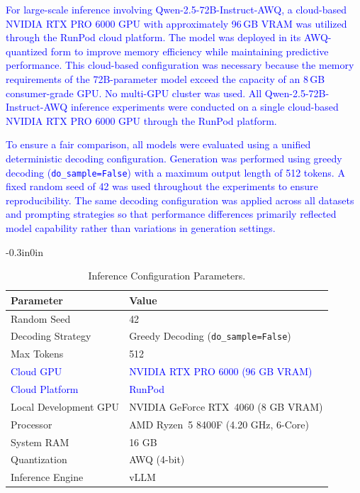 \documentclass[10pt,letterpaper]{article}
\newcommand{\rev}[1]{\textcolor{blue}{#1}}
\begin{document}
\rev{
For large-scale inference involving Qwen-2.5-72B-Instruct-AWQ, a cloud-based NVIDIA RTX PRO 6000 GPU with approximately 96\,GB VRAM was utilized through the RunPod cloud platform. The model was deployed in its AWQ-quantized form to improve memory efficiency while maintaining predictive performance. This cloud-based configuration was necessary because the memory requirements of the 72B-parameter model exceed the capacity of an 8\,GB consumer-grade GPU. No multi-GPU cluster was used. All Qwen-2.5-72B-Instruct-AWQ inference experiments were conducted on a single cloud-based NVIDIA RTX PRO 6000 GPU through the RunPod platform.
}

\rev{
To ensure a fair comparison, all models were evaluated using a unified deterministic decoding configuration. Generation was performed using greedy decoding (\texttt{do\_sample=False}) with a maximum output length of 512 tokens. A fixed random seed of 42 was used throughout the experiments to ensure reproducibility. The same decoding configuration was applied across all datasets and prompting strategies so that performance differences primarily reflected model capability rather than variations in generation settings.
}

\begin{table}[!t]
\begin{adjustwidth}{-0.3in}{0in}
\centering
\small
\caption{Inference Configuration Parameters.}
\label{tab:inference}
\renewcommand{\arraystretch}{1.2}
\setlength{\tabcolsep}{10pt}

\begin{tabular}{|l|p{9cm}|}
\hline
\textbf{Parameter} & \textbf{Value} \\
\hline

Random Seed & 42 \\\hline
Decoding Strategy & Greedy Decoding (\texttt{do\_sample=False}) \\\hline
Max Tokens & 512 \\\hline

\rev{Cloud GPU} &
\rev{NVIDIA RTX PRO 6000 (96 GB VRAM)} \\\hline

\rev{Cloud Platform} &
\rev{RunPod} \\\hline

Local Development GPU &
NVIDIA GeForce RTX~4060 (8 GB VRAM) \\\hline

Processor &
AMD Ryzen~5 8400F (4.20 GHz, 6-Core) \\\hline

System RAM &
16 GB \\\hline

Quantization &
AWQ (4-bit) \\\hline

Inference Engine &
vLLM \\\hline

\end{tabular}

\end{adjustwidth}
\end{table}
\end{document}
